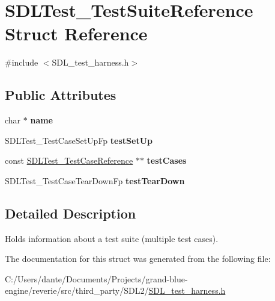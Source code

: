 \hypertarget{struct_s_d_l_test___test_suite_reference}{}\section{S\+D\+L\+Test\+\_\+\+Test\+Suite\+Reference Struct Reference}
\label{struct_s_d_l_test___test_suite_reference}


{\ttfamily \#include $<$S\+D\+L\+\_\+test\+\_\+harness.\+h$>$}

\subsection*{Public Attributes}
\begin{DoxyCompactItemize}
\item 
\mbox{\label{struct_s_d_l_test___test_suite_reference_a8b002d932f91b321b384e59ae17f8f39}} 
char $\ast$ {\bfseries name}
\item 
\mbox{\label{struct_s_d_l_test___test_suite_reference_a8aa788b982efb93c93c2ab01202e0007}} 
S\+D\+L\+Test\+\_\+\+Test\+Case\+Set\+Up\+Fp {\bfseries test\+Set\+Up}
\item 
\mbox{\label{struct_s_d_l_test___test_suite_reference_a06d97ce5bcf9ceb1300cc4aa39c028d3}} 
const \mbox{\hyperlink{struct_s_d_l_test___test_case_reference}{S\+D\+L\+Test\+\_\+\+Test\+Case\+Reference}} $\ast$$\ast$ {\bfseries test\+Cases}
\item 
\mbox{\label{struct_s_d_l_test___test_suite_reference_ad66abaf20653fd7361d28c69f88ac702}} 
S\+D\+L\+Test\+\_\+\+Test\+Case\+Tear\+Down\+Fp {\bfseries test\+Tear\+Down}
\end{DoxyCompactItemize}


\subsection{Detailed Description}
Holds information about a test suite (multiple test cases). 

The documentation for this struct was generated from the following file\+:\begin{DoxyCompactItemize}
\item 
C\+:/\+Users/dante/\+Documents/\+Projects/grand-\/blue-\/engine/reverie/src/third\+\_\+party/\+S\+D\+L2/\mbox{\hyperlink{_s_d_l__test__harness_8h}{S\+D\+L\+\_\+test\+\_\+harness.\+h}}\end{DoxyCompactItemize}
